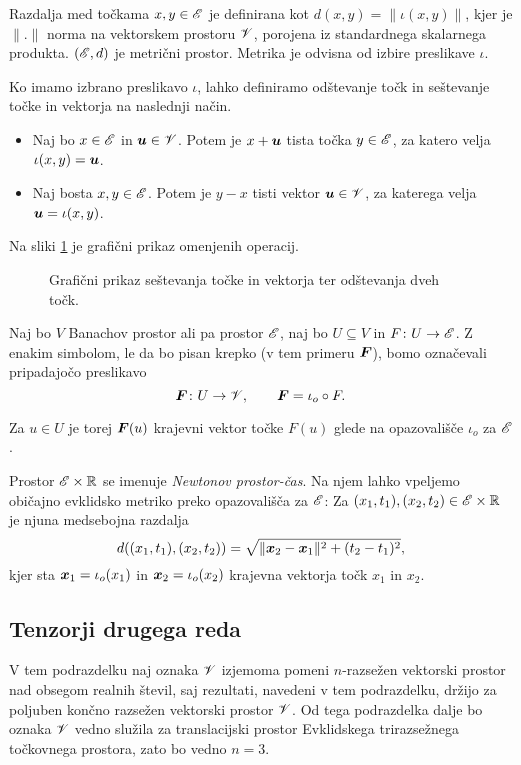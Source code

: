 Razdalja med točkama $x,y\in\mathscr E$ je definirana kot $d(x,y)=\|\iota(x,y)\|$, kjer je $\|.\|$ norma na
vektorskem prostoru $\mathscr V$, porojena iz standardnega skalarnega produkta. $(\mathscr E,d)$ je metrični prostor.
Metrika je odvisna od izbire preslikave $\iota$.

Ko imamo izbrano preslikavo $\iota$, lahko definiramo odštevanje točk in sešte\-vanje točke in vektorja
na naslednji način. \label{seto}
\begin{itemize}
	\item Naj bo $x\in\mathscr E$ in $\boldsymbol u\in\mathscr V$. Potem je $x+\boldsymbol u$ tista točka $y\in\mathscr E$, za
	katero velja $\iota(x,y)=\boldsymbol u$.
	\item Naj bosta $x,y\in\mathscr E$. Potem je $y-x$ tisti vektor $\boldsymbol u\in\mathscr V$, za katerega
	velja $\boldsymbol u=\iota(x,y)$.
\end{itemize}
Na sliki \ref{pic:evk} je grafični prikaz omenjenih operacij.
\begin{figure}[ht] \begin{center}
	
	\caption{Grafični prikaz seštevanja točke in vektorja ter odštevanja dveh točk.}
	\label{pic:evk}
\end{center} \end{figure}

\begin{dogovor} \label{d:dogovor}
	Naj bo $V$ Banachov prostor ali pa prostor $\mathscr E$, naj bo $U\subseteq V$ in
	$F\colon U\to \mathscr E$. Z enakim simbolom, le da bo pisan krepko (v tem primeru $\boldsymbol F$),
	bomo označevali pripadajočo preslikavo
	\[
		\boldsymbol F\colon U\to\mathscr V,\qquad \boldsymbol F=\iota_o\circ F.
	\]
\end{dogovor}
Za $u\in U$ je torej $\boldsymbol F(u)$ krajevni vektor točke $F(u)$ glede na opazovališče $\iota_o$ za $\mathscr E$.

Prostor $\mathscr E\times\mathbb R$ se imenuje \emph{Newtonov prostor-čas}. Na njem lahko vpeljemo običajno evklidsko
metriko preko opazovališča za $\mathscr E$: Za $(x_1,t_1),(x_2,t_2)\in\mathscr E\times\mathbb R$ je njuna
medsebojna razdalja
\[
	d((x_1,t_1),(x_2,t_2))=\sqrt{\|\boldsymbol x_2-\boldsymbol x_1\|^2+(t_2-t_1)^2},
\]
kjer sta $\boldsymbol x_1=\iota_o(x_1)$ in $\boldsymbol x_2=\iota_o(x_2)$ krajevna vektorja točk $x_1$ in $x_2$.


\subsection{Tenzorji drugega reda} \label{pdrten2}


V tem podrazdelku naj oznaka $\mathscr V$ izjemoma pomeni $n$-razsežen vektorski prostor nad
obsegom realnih števil, saj rezultati, navedeni v tem podrazdelku, držijo za poljuben
končno razsežen vektorski prostor $\mathscr V$. Od tega podrazdelka dalje bo oznaka $\mathscr V$ vedno
služila za translacijski prostor Evklidskega trirazsežnega točkovnega prostora, zato bo vedno $n=3$.

